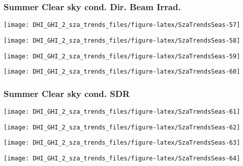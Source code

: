 \documentclass[
  10pt,
  a4paper,oneside]{article}
\begin{document}
\newpage

\hypertarget{summer-clear-sky-cond.-dir.-beam-irrad.}{%
\subsubsection{Summer Clear sky cond. Dir. Beam Irrad.}\label{summer-clear-sky-cond.-dir.-beam-irrad.}}

\begin{center}\texttt{[image: DHI\_GHI\_2\_sza\_trends\_files/figure-latex/SzaTrendsSeas-57]} \end{center}

\begin{center}\texttt{[image: DHI\_GHI\_2\_sza\_trends\_files/figure-latex/SzaTrendsSeas-58]} \end{center}

\begin{center}\texttt{[image: DHI\_GHI\_2\_sza\_trends\_files/figure-latex/SzaTrendsSeas-59]} \end{center}

\begin{center}\texttt{[image: DHI\_GHI\_2\_sza\_trends\_files/figure-latex/SzaTrendsSeas-60]} \end{center}

\newpage

\hypertarget{summer-clear-sky-cond.-sdr}{%
\subsubsection{Summer Clear sky cond. SDR}\label{summer-clear-sky-cond.-sdr}}

\begin{center}\texttt{[image: DHI\_GHI\_2\_sza\_trends\_files/figure-latex/SzaTrendsSeas-61]} \end{center}

\begin{center}\texttt{[image: DHI\_GHI\_2\_sza\_trends\_files/figure-latex/SzaTrendsSeas-62]} \end{center}

\begin{center}\texttt{[image: DHI\_GHI\_2\_sza\_trends\_files/figure-latex/SzaTrendsSeas-63]} \end{center}

\begin{center}\texttt{[image: DHI\_GHI\_2\_sza\_trends\_files/figure-latex/SzaTrendsSeas-64]} \end{center}
\end{document}
